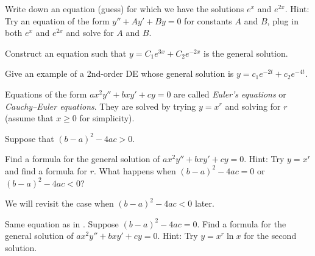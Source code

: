 \begin{exercise}\ansMark%
Write down an equation (guess) for which we have the solutions
$e^x$ and $e^{2x}$.  Hint: Try an equation of the form
$y''+Ay'+By = 0$ for constants $A$ and $B$,
plug in both $e^x$ and $e^{2x}$ and solve for $A$ and $B$.
\end{exercise}

\begin{exercise}\ansMark%
Construct an equation such that $y = C_1 e^{3x} + C_2 e^{-2x}$ is the general
solution.
\end{exercise}

\begin{exercise}
Give an example of a 2nd-order DE whose general solution is $y=c_1e^{-2t}+c_2e^{-4t}$.
\end{exercise}

\pagebreak[2]
Equations of the form $a x^2 y'' + b x y' + c y = 0$ are called
\emph{Euler's equations} or
\emph{Cauchy--Euler equations}.
They are solved by trying
$y=x^r$ and solving for $r$ (assume that $x \geq 0$ for simplicity).

\begin{exercise} \label{sol:eulerex}
\pagebreak[2]
Suppose that ${(b-a)}^2-4ac > 0$.
\begin{tasks}
\task Find a formula for the general solution
of $a x^2 y'' + b x y' + c y = 0$.  Hint: Try $y=x^r$ and find a formula for
$r$.
\task What happens when ${(b-a)}^2-4ac = 0$ or ${(b-a)}^2-4ac < 0$?
\end{tasks}
\end{exercise}

We will revisit the case when ${(b-a)}^2-4ac < 0$ later.

\begin{exercise} \label{sol:eulerexln}
Same equation as in .
Suppose ${(b-a)}^2-4ac = 0$.  Find a formula for the general solution
of $a x^2 y'' + b x y' + c y = 0$.  Hint: Try $y=x^r \ln x$ for the second
solution.
\end{exercise}


\setcounter{exercise}{100}



